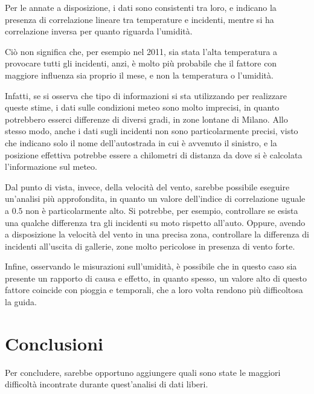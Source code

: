 \documentclass[a4paper,12pt]{report}
\begin{document}
Per le annate a disposizione, i dati sono consistenti tra loro, e indicano la presenza di 
correlazione lineare tra temperature e incidenti, mentre si ha correlazione inversa per quanto 
riguarda l'umidità.

Ciò non significa che, per esempio nel 2011, sia stata l'alta temperatura a provocare 
tutti gli incidenti, anzi, è molto più probabile che il fattore con maggiore 
influenza sia proprio il mese, e non la temperatura o l'umidità.

Infatti, se si osserva che tipo di informazioni si sta utilizzando per realizzare 
queste stime, i dati sulle condizioni meteo sono molto imprecisi, in quanto potrebbero 
esserci differenze di diversi gradi, in zone lontane di Milano.
Allo stesso modo, anche i dati sugli incidenti non sono particolarmente precisi, 
visto che indicano solo il nome dell'autostrada in cui è avvenuto 
il sinistro, e la posizione effettiva potrebbe essere a chilometri di distanza da dove 
si è calcolata l'informazione sul meteo.

Dal punto di vista, invece, della velocità del vento, sarebbe possibile eseguire 
un'analisi più approfondita, in quanto un valore dell'indice di correlazione uguale 
a $0.5$ non è particolarmente alto.
Si potrebbe, per esempio, controllare se esista una qualche differenza tra gli 
incidenti su moto rispetto all'auto. 
Oppure, avendo a disposizione la velocità del vento in una precisa zona, controllare 
la differenza di incidenti all'uscita di gallerie, zone molto pericolose 
in presenza di vento forte.

Infine, osservando le misurazioni sull'umidità, è possibile che in questo caso sia presente 
un rapporto di causa e effetto, in quanto spesso, un valore alto di questo fattore 
coincide con pioggia e temporali, che a loro volta rendono più difficoltosa la guida.


\chapter{Conclusioni}

Per concludere, sarebbe opportuno aggiungere quali sono state le maggiori difficoltà 
incontrate durante quest'analisi di dati liberi.
\end{document}
